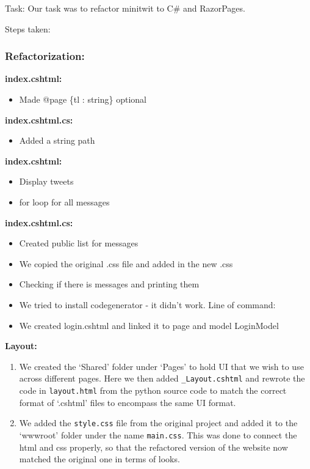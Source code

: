 Task: Our task was to refactor minitwit to C\# and RazorPages.

Steps taken:

\subsubsection{Refactorization:}
\label{log:refactorization}

\textbf{index.cshtml:}

\begin{itemize}
    \item Made @page \{tl : string\} optional
\end{itemize}

\textbf{index.cshtml.cs:}

\begin{itemize}
    \item Added a string path
\end{itemize}

\textbf{index.cshtml:}

\begin{itemize}
    \item Display tweets
    \item for loop for all messages
\end{itemize}

\textbf{index.cshtml.cs:}

\begin{itemize}
    \item Created public list for messages
    \item We copied the original .css file and added in the new .css
    \item Checking if there is messages and printing them
    \item We tried to install codegenerator - it didn't work. Line of command:
    \item We created login.cshtml and linked it to page and model LoginModel
\end{itemize}

\textbf{Layout:}

\begin{enumerate}
    \item We created the `Shared' folder under `Pages' to hold UI that we wish to use across different pages. Here we then added \texttt{\_Layout.cshtml} and rewrote the code in \texttt{layout.html} from the python source code to match the correct format of `.cshtml' files to encompass the same UI format.
    \item We added the \texttt{style.css} file from the original project and  added it to the `wwwroot' folder under the name \texttt{main.css}.  This was done to connect the html and css properly, so that the refactored version of the website now matched the original one in terms of looks.
\end{enumerate}

